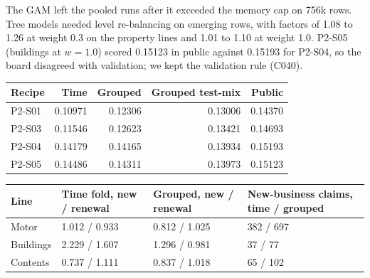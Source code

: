 \documentclass[11pt,a4paper]{article}
\makeatletter
\newenvironment{fixedtable}%
  {\par\medskip\noindent\begin{minipage}{\linewidth}\def\@captype{table}\centering}%
  {\end{minipage}\par\medskip}
\newcommand{\code}[1]{\texttt{#1}}
\newcommand{\Dsq}{D$^2$}
\makeatother
\begin{document}
The GAM left the pooled runs after it exceeded the memory cap on 756k rows. Tree models needed level re-balancing on
emerging rows, with factors of 1.08 to 1.26 at weight 0.3 on the property lines and 1.01 to 1.10 at weight 1.0.
P2-S05 (buildings at $w = 1.0$) scored 0.15123 in public against 0.15193 for P2-S04, so the board disagreed with
validation; we kept the validation rule (C040).

\begin{fixedtable}
\centering\small
\begin{tabular}{lrrrr}
\toprule
Recipe & Time & Grouped & Grouped test-mix & Public\\
\midrule
P2-S01 & 0.10971 & 0.12306 & 0.13006 & 0.14370\\
P2-S03 & 0.11546 & 0.12623 & 0.13421 & 0.14693\\
P2-S04 & 0.14179 & 0.14165 & 0.13934 & 0.15193\\
P2-S05 & 0.14486 & 0.14311 & 0.13973 & 0.15123\\
\bottomrule
\end{tabular}
\caption{Audit evidence for P2-F1: Kaggle-like \Dsq{} of the three lines stacked, each line sum-calibrated.}
\end{fixedtable}

\begin{fixedtable}
\centering\small
\begin{tabular}{llll}
\toprule
Line & Time fold, new / renewal & Grouped, new / renewal & New-business claims, time / grouped\\
\midrule
Motor & 1.012 / 0.933 & 0.812 / 1.025 & 382 / 697\\
Buildings & 2.229 / 1.607 & 1.296 / 0.981 & 37 / 77\\
Contents & 0.737 / 1.111 & 0.837 / 1.018 & 65 / 102\\
\bottomrule
\end{tabular}
\caption{Predicted-to-actual on reported cost for the P2-S05 blend, by segment. Source:
\code{docs/part2\_new\_business\_check.md}.}
\end{fixedtable}
\end{document}
